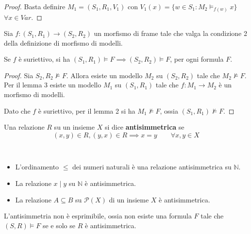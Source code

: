 \documentclass[../main.tex]{subfiles}
\begin{document}
\begin{proof}
    Basta definire $M_1 = (S_1, R_1, V_1)$ con $V_1(x) = \{ w \in S_1 : M_2 \vDash_{f(w)} x\}$ $\forall x \in Var$.
\end{proof}
\begin{lemma}[Lemma 4]
    Sia $f: (S_1, R_1) \rightarrow (S_2, R_2)$ un morfismo di frame tale che valga la condizione 2 della definizione di morfismo di modelli.

    Se $f$ è suriettivo, si ha $(S_1, R_1) \vDash F \implies (S_2, R_2) \vDash F$, per ogni formula $F$.
\end{lemma}
\begin{proof}
    Sia $S_2, R_2 \nvDash F$. Allora esiste un modello $M_2$ su $(S_2, R_2)$ tale che $M_2 \nvDash F$. Per il lemma 3 esiste un modello $M_1$ su $(S_1, R_1)$ tale che $f: M_1 \rightarrow M_2$ è un morfismo di modelli.

    Dato che $f$ è suriettivo, per il lemma 2 si ha $M_1 \nvDash F$, ossia $(S_1, R_1) \nvDash F$.
\end{proof}
\begin{definition}
    Una relazione $R$ su un insieme $X$ si dice \textbf{antisimmetrica} se
    \begin{equation*}
        (x,y) \in R, (y,x) \in R \implies x = y \qquad \forall x,y \in X
    \end{equation*}
\end{definition}
\begin{example}\
    \begin{itemize}
        \item L'ordinamento $\leq$ dei numeri naturali è una relazione antisimmetrica su $\mathbb{N}$.
        \item La relazione $x \mid y$ su $\mathbb{N}$ è antisimmetrica.
        \item La relazione $A \subseteq B$ su $\mathcal{P}(X)$ di un insieme $X$ è antisimmetrica.
    \end{itemize}
\end{example}
\begin{theorem}
    L'antisimmetria non è esprimibile, ossia non esiste una formula $F$ tale che $(S,R) \vDash F$ se e solo se $R$ è antisimmetrica.
\end{theorem}
\end{document}
